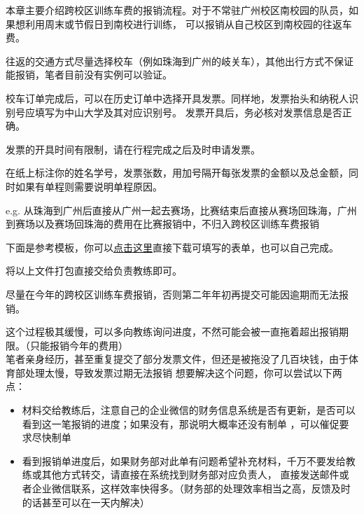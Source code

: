 \ChapterGuide
  {
   }
  {}
  {}
\setlength{\parindent}{2\ccwd}

本章主要介绍跨校区训练车费的报销流程。对于不常驻广州校区南校园的队员，如果想利用周末或节假日到南校进行训练，
可以报销从自己校区到南校园的往返车费。

往返的交通方式尽量选择校车（例如珠海到广州的岐关车），其他出行方式不保证能报销，笔者目前没有实例可以验证。




校车订单完成后，可以在历史订单中选择开具发票。同样地，发票抬头和纳税人识别号应填写为中山大学及其对应识别号。
发票开具后，务必核对发票信息是否正确。

发票的开具时间有限制，请在行程完成之后及时申请发票。


在纸上标注你的姓名学号，发票张数，用加号隔开每张发票的金额以及总金额，同时如果有单程则需要说明单程原因。

e.g.\hspace{0.4cm} 从珠海到广州后直接从广州一起去赛场，比赛结束后直接从赛场回珠海，广州到赛场以及赛场回珠海的费用在比赛报销中，不归入跨校区训练车费报销

下面是参考模板，你可以\href{https://github.com/PhSeCl/SYSU-Reimbursement-Handbook/releases/download/v2026.11.05/cross-campus-summary-form.pdf}{\textcolor{BookBlue}{点击这里}}直接下载可填写的表单，也可以自己完成。


将以上文件打包直接交给负责教练即可。

尽量在今年的跨校区训练车费报销，否则第二年年初再提交可能因逾期而无法报销。

\begin{SideNote}
这个过程极其缓慢，可以多向教练询问进度，不然可能会被一直拖着超出报销期限。（只能报销今年的费用）\\
笔者亲身经历，甚至重复提交了部分发票文件，但还是被拖没了几百块钱，由于体育部处理太慢，导致发票过期无法报销
想要解决这个问题，你可以尝试以下两点：
\begin{itemize}
  \item 材料交给教练后，注意自己的企业微信的财务信息系统是否有更新，是否可以看到这一笔报销的进度；如果没有，那说明大概率还没有制单
  ，可以催促要求尽快制单
  \item 看到报销单进度后，如果财务部对此单有问题希望补充材料，千万不要发给教练或其他方式转交，请直接在系统找到财务部对应负责人，
  直接发送邮件或者企业微信联系，这样效率快得多。（财务部的处理效率相当之高，反馈及时的话甚至可以在一天内解决）
\end{itemize}
\end{SideNote}

